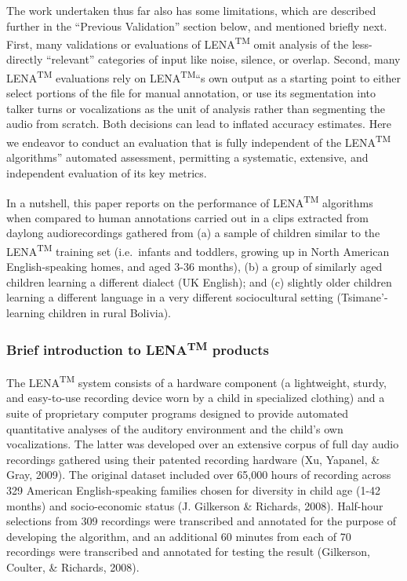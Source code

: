 \documentclass[english,floatsintext,man]{apa6}
\begin{document}
The work undertaken thus far also has some limitations, which are
described further in the \enquote{Previous Validation} section below,
and mentioned briefly next. First, many validations or evaluations of
LENA\textsuperscript{TM} omit analysis of the less-directly
\enquote{relevant} categories of input like noise, silence, or overlap.
Second, many LENA\textsuperscript{TM} evaluations rely on
LENA\textsuperscript{TM}\enquote{s own output as a starting point to
either select portions of the file for manual annotation, or use its
segmentation into talker turns or vocalizations as the unit of analysis
rather than segmenting the audio from scratch. Both decisions can lead
to inflated accuracy estimates. Here we endeavor to conduct an
evaluation that is fully independent of the LENA\textsuperscript{TM}
algorithms} automated assessment, permitting a systematic, extensive,
and independent evaluation of its key metrics.

In a nutshell, this paper reports on the performance of
LENA\textsuperscript{TM} algorithms when compared to human annotations
carried out in a clips extracted from daylong audiorecordings gathered
from (a) a sample of children similar to the LENA\textsuperscript{TM}
training set (i.e.~infants and toddlers, growing up in North American
English-speaking homes, and aged 3-36 months), (b) a group of similarly
aged children learning a different dialect (UK English); and (c)
slightly older children learning a different language in a very
different sociocultural setting (Tsimane'-learning children in rural
Bolivia).

\subsubsection{\texorpdfstring{Brief introduction to
LENA\textsuperscript{TM}
products}{Brief introduction to LENATM products}}\label{brief-introduction-to-lenatm-products}

The LENA\textsuperscript{TM} system consists of a hardware component (a
lightweight, sturdy, and easy-to-use recording device worn by a child in
specialized clothing) and a suite of proprietary computer programs
designed to provide automated quantitative analyses of the auditory
environment and the child's own vocalizations. The latter was developed
over an extensive corpus of full day audio recordings gathered using
their patented recording hardware (Xu, Yapanel, \& Gray, 2009). The
original dataset included over 65,000 hours of recording across 329
American English-speaking families chosen for diversity in child age
(1-42 months) and socio-economic status (J. Gilkerson \& Richards,
2008). Half-hour selections from 309 recordings were transcribed and
annotated for the purpose of developing the algorithm, and an additional
60 minutes from each of 70 recordings were transcribed and annotated for
testing the result (Gilkerson, Coulter, \& Richards, 2008).
\end{document}

